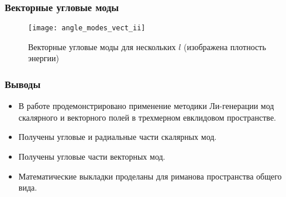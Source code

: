 \documentclass{beamer}
\begin{document}

    \begin{frame}\frametitle{Векторные угловые моды}

        \begin{figure}[h]
            \centering
            \texttt{[image: angle\_modes\_vect\_ii]}
            \caption[]{Векторные угловые моды для нескольких $l$ (изображена плотность энергии)}
            \label{fig:angle_modes_vect_ii}
        \end{figure}

    \end{frame}


    \begin{frame}\frametitle{Выводы}

        \begin{itemize}
            \item В работе продемонстрировано применение методики Ли-генерации мод скалярного и векторного полей в трехмерном евклидовом пространстве.

            \item Получены угловые и радиальные части скалярных мод.

            \item Получены угловые части векторных мод.

            \item Математические выкладки проделаны для риманова пространства общего вида.
        \end{itemize}

    \end{frame}

\end{document}
